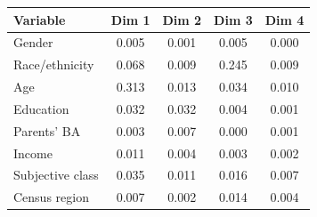 \begin{tabular}{lcccc}
\toprule
Variable & Dim 1 & Dim 2 & Dim 3 & Dim 4 \\
\midrule
Gender & 0.005 & 0.001 & 0.005 & 0.000 \\
Race/ethnicity & 0.068 & 0.009 & 0.245 & 0.009 \\
Age & 0.313 & 0.013 & 0.034 & 0.010 \\
Education & 0.032 & 0.032 & 0.004 & 0.001 \\
Parents' BA & 0.003 & 0.007 & 0.000 & 0.001 \\
Income & 0.011 & 0.004 & 0.003 & 0.002 \\
Subjective class & 0.035 & 0.011 & 0.016 & 0.007 \\
Census region & 0.007 & 0.002 & 0.014 & 0.004 \\
\bottomrule
\end{tabular}

